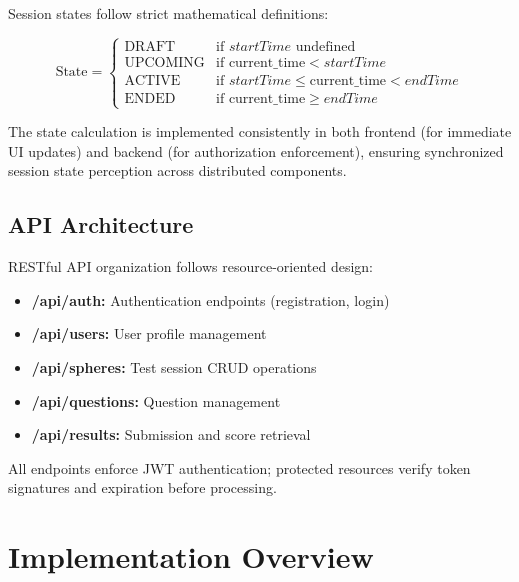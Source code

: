 \documentclass[12pt,a4paper]{report}
\begin{document}
Session states follow strict mathematical definitions:

\begin{equation*}
    \text{State} = \begin{cases}
      \text{DRAFT} & \text{if } \textit{startTime} \text{ undefined} \\
      \text{UPCOMING} & \text{if } \text{current}\_ \text{time} < \textit{startTime} \\
      \text{ACTIVE} & \text{if } \textit{startTime} \leq \text{current}\_ \text{time} < \textit{endTime} \\
      \text{ENDED} & \text{if } \text{current}\_ \text{time} \geq \textit{endTime}
    \end{cases}
\end{equation*}

The state calculation is implemented consistently in both frontend (for immediate UI updates) and backend (for authorization enforcement), ensuring synchronized session state perception across distributed components.

\section{API Architecture}

RESTful API organization follows resource-oriented design:

\begin{itemize}[left=0pt]
  \item \textbf{/api/auth:} Authentication endpoints (registration, login)
  \item \textbf{/api/users:} User profile management
  \item \textbf{/api/spheres:} Test session CRUD operations
  \item \textbf{/api/questions:} Question management
  \item \textbf{/api/results:} Submission and score retrieval
\end{itemize}

All endpoints enforce JWT authentication; protected resources verify token signatures and expiration before processing.

\cleardoublepage


\chapter{Implementation Overview}
\end{document}
